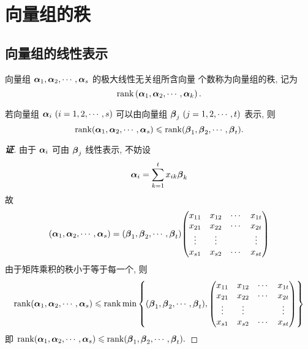 \section{向量组的秩}

\subsection{向量组的线性表示}

\begin{definition}[向量组的秩]
    向量组 $ \vb*{\alpha}_{1}, \vb*{\alpha}_{2}, \cdots, \vb*{\alpha}_{s} $ 的极大线性无关组所含向量 个数称为向量组的秩, 记为 
    $$ \rank\left(\vb*{\alpha}_{1}, \vb*{\alpha}_{2}, \cdots, \vb*{\alpha}_{k}\right) .$$
\end{definition}

\begin{theorem}
    若向量组 $\vb*{\alpha}_i~ (i=1,2,\cdots,s)$ 可以由向量组 $\vb*{\beta}_j~ (j=1,2,\cdots,t)$ 表示, 则
    $$\rank(\vb*{\alpha}_1,\vb*{\alpha}_2,\cdots,\vb*{\alpha}_s)\leqslant \rank(\vb*{\beta}_1,\vb*{\beta}_2,\cdots,\vb*{\beta}_t).$$
\end{theorem}
\begin{proof}[{\songti \textbf{证}}]
    由于 $\vb*{\alpha}_i$ 可由 $\vb*{\beta}_j$ 线性表示, 不妨设 $$\vb*{\alpha}_i=\sum_{k=1}^{t}x_{ik}\vb*{\beta}_k$$
    故 $$(\vb*{\alpha}_1,\vb*{\alpha}_2,\cdots,\vb*{\alpha}_s)=(\vb*{\beta}_1,\vb*{\beta}_2,\cdots,\vb*{\beta}_t)\mqty(x_{11}&x_{12}&\cdots&x_{1t}\\x_{21}&x_{22}&\cdots&x_{2t}\\\vdots &\vdots&&\vdots\\x_{s1}&x_{s2}&\cdots&x_{st})$$
    由于矩阵乘积的秩小于等于每一个, 则
    $$\rank(\vb*{\alpha}_1,\vb*{\alpha}_2,\cdots,\vb*{\alpha}_s)\leqslant \rank\min\qty{(\vb*{\beta}_1,\vb*{\beta}_2,\cdots,\vb*{\beta}_t),\mqty(x_{11}&x_{12}&\cdots&x_{1t}\\x_{21}&x_{22}&\cdots&x_{2t}\\\vdots &\vdots&&\vdots\\x_{s1}&x_{s2}&\cdots&x_{st})}$$
    即 $\rank(\vb*{\alpha}_1,\vb*{\alpha}_2,\cdots,\vb*{\alpha}_s)\leqslant \rank(\vb*{\beta}_1,\vb*{\beta}_2,\cdots,\vb*{\beta}_t).$
\end{proof}

